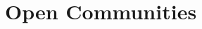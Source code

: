 
\section{Open Communities}
\begin{comment}
* What is open / what are open communities?
** What's open source/content?
** some projects you may have heard of (Firefox, Wikipedia, etc)
** some you may not have (Wikiotics, CivX, FreeCiv, Civicommons, Sahana, CiviCRM)
** it's not just Linux - a lot of this stuff runs on other platforms too (Windows, Mac, web-based) "no, we are not trying to get you to reinstall your computer" (but if you're interested, we're happy to help)
** the Four Freedoms (made for software)
*** Freedom / friends / ?
** creative commons (made for content)
** it's more than licensing... what's "the open source way," some characteristics of those communities (realtime transparency, etc)
\end{comment}
